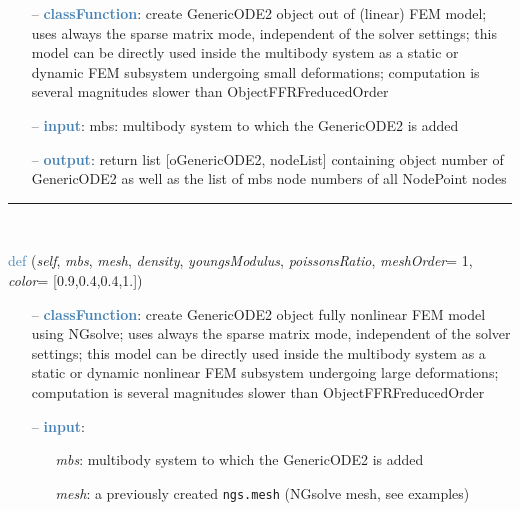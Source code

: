 \begin{itemize}[leftmargin=1.4cm]
\begin{itemize}[leftmargin=1.4cm]
\begin{itemize}[leftmargin=1.4cm]
\begin{itemize}[leftmargin=0.5cm]
\begin{itemize}[leftmargin=1.4cm]
\begin{itemize}[leftmargin=1.4cm]
\begin{itemize}[leftmargin=0.5cm]
\begin{itemize}[leftmargin=0.7cm]
\item[--]\textcolor{steelblue}{\bf classFunction}: create GenericODE2 object out of (linear) FEM model; uses always the sparse matrix mode, independent of the solver settings; this model can be directly used inside the multibody system as a static or dynamic FEM subsystem undergoing small deformations; computation is several magnitudes slower than ObjectFFRFreducedOrder
\item[--]\textcolor{steelblue}{\bf input}: mbs: multibody system to which the GenericODE2 is added
\item[--]\textcolor{steelblue}{\bf output}: return list [oGenericODE2, nodeList] containing object number of GenericODE2 as well as the list of mbs node numbers of all NodePoint nodes
\vspace{12pt}\end{itemize}
%
\noindent\rule{8cm}{0.75pt}\vspace{1pt} \\ 
\begin{flushleft}
\noindent \textcolor{steelblue}{def {\bf {}}}\label{sec:FEM:FEMinterface:CreateNonlinearFEMObjectGenericODE2NGsolve}
({\it self}, {\it mbs}, {\it mesh}, {\it density}, {\it youngsModulus}, {\it poissonsRatio}, {\it meshOrder}= 1, {\it color}= [0.9,0.4,0.4,1.])
\end{flushleft}
\setlength{\itemindent}{0.7cm}
\begin{itemize}[leftmargin=0.7cm]
\item[--]\textcolor{steelblue}{\bf classFunction}: create GenericODE2 object fully nonlinear FEM model using NGsolve; uses always the sparse matrix mode, independent of the solver settings; this model can be directly used inside the multibody system as a static or dynamic nonlinear FEM subsystem undergoing large deformations; computation is several magnitudes slower than ObjectFFRFreducedOrder
\item[--]\textcolor{steelblue}{\bf input}: \vspace{-6pt}
\begin{itemize}[leftmargin=1.2cm]
\setlength{\itemindent}{-0.7cm}
\item[]{\it mbs}: multibody system to which the GenericODE2 is added
\item[]{\it mesh}: a previously created \texttt{ngs.mesh} (NGsolve mesh, see examples)

\end{itemize}
\end{itemize}
\end{itemize}
\end{itemize}
\end{itemize}
\end{itemize}
\end{itemize}
\end{itemize}
\end{itemize}
